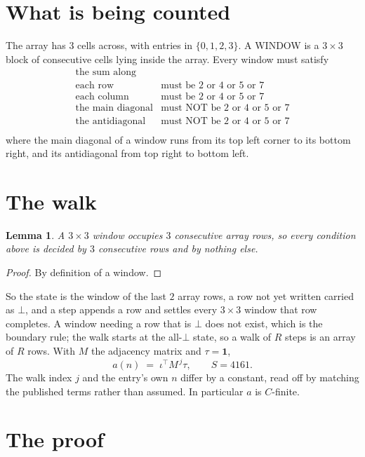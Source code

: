 \documentclass[11pt,a4paper]{article}
\theoremstyle{plain}
\newtheorem{lemma}[theorem]{Lemma}
\theoremstyle{definition}
\begin{document}
\section{What is being counted}

The array has $3$ cells across, with entries in $\{0,1,2,3\}$. A WINDOW is a $3\times3$ block
of consecutive cells lying inside the array. Every window must satisfy
\[
\begin{array}{ll}
\text{the sum along} & \text{} \\[2pt]
\text{each row} & \text{must be 2 or 4 or 5 or 7} \\
\text{each column} & \text{must be 2 or 4 or 5 or 7} \\
\text{the main diagonal} & \text{must NOT be 2 or 4 or 5 or 7} \\
\text{the antidiagonal} & \text{must NOT be 2 or 4 or 5 or 7} \\
\end{array}
\]
where the main diagonal of a window runs from its top left corner to its bottom right, and its
antidiagonal from top right to bottom left.

\section{The walk}

\begin{lemma}\label{lem:win}
A $3\times3$ window occupies $3$ consecutive array rows, so every condition above is
decided by $3$ consecutive rows and by nothing else.
\end{lemma}

\begin{proof}
By definition of a window.
\end{proof}

So the state is the window of the last $2$ array rows, a row not yet written carried as
$\bot$, and a step appends a row and settles every $3\times3$ window that row completes. A
window needing a row that is $\bot$ does not exist, which is the boundary rule; the walk starts
at the all-$\bot$ state, so a walk of $R$ steps is an array of $R$ rows. With $M$ the adjacency
matrix and $\tau=\mathbf{1}$,
\[
a(n)\;=\;\iota^{\!\top}M^{\,j}\tau ,\qquad S=4161.
\]
The walk index $j$ and the entry's own $n$ differ by a constant, read off by matching the
published terms rather than assumed. In particular $a$ is $C$-finite.

\section{The proof}
\end{document}
